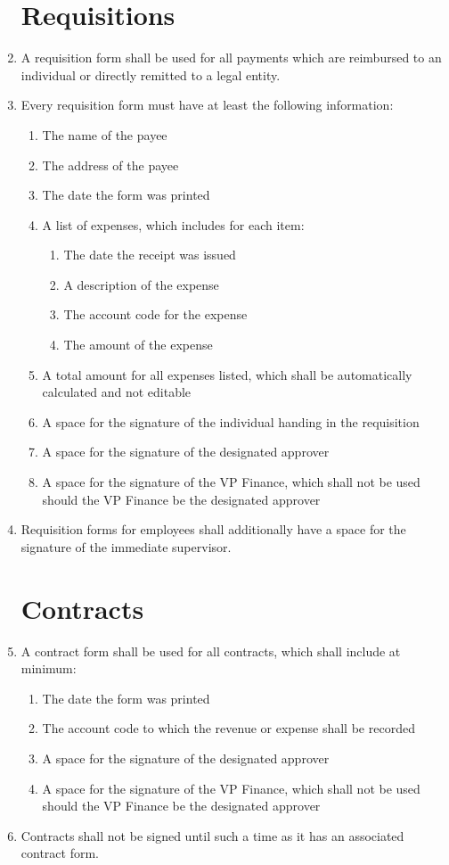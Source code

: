 \documentclass[oneside]{book}
\begin{document}
\begin{enumerate}
\section{\label{requisitions}Requisitions}

\item A requisition form shall be used for all payments which are reimbursed to an individual or directly remitted to a legal entity.
\item Every requisition form must have at least the following information:
	\begin{enumerate}
	\item The name of the payee
	\item The address of the payee
	\item The date the form was printed
	\item A list of expenses, which includes for each item:
		\begin{enumerate}
		\item The date the receipt was issued
		\item A description of the expense
		\item The account code for the expense
		\item The amount of the expense
		\end{enumerate}
	\item A total amount for all expenses listed, which shall be automatically calculated and not editable
	\item A space for the signature of the individual handing in the requisition
	\item A space for the signature of the designated approver
	\item A space for the signature of the VP Finance, which shall not be used should the VP Finance be the designated approver
	\end{enumerate}
\item Requisition forms for employees shall additionally have a space for the signature of the immediate supervisor.

\section{\label{Contracts}Contracts}

\item A contract form shall be used for all contracts, which shall include at minimum:
	\begin{enumerate}
	\item The date the form was printed
	\item The account code to which the revenue or expense shall be recorded
	\item A space for the signature of the designated approver
	\item A space for the signature of the VP Finance, which shall not be used should the VP Finance be the designated approver
	\end{enumerate}
\item Contracts shall not be signed until such a time as it has an associated contract form.


\end{enumerate}
\end{document}
